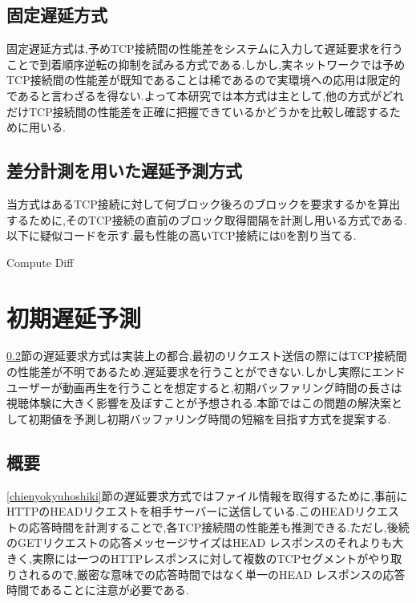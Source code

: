 \documentclass[a4j,12pt]{gradthesis_utf8}
\begin{document}
\subsection{固定遅延方式}
\label{kotei}
固定遅延方式は,予めTCP接続間の性能差をシステムに入力して遅延要求を行うことで到着順序逆転の抑制を試みる方式である.しかし,実ネットワークでは予めTCP接続間の性能差が既知であることは稀であるので実環境への応用は限定的であると言わざるを得ない.よって本研究では本方式は主として,他の方式がどれだけTCP接続間の性能差を正確に把握できているかどうかを比較し確認するために用いる.

\subsection{差分計測を用いた遅延予測方式}
\label{diff}
当方式はあるTCP接続に対して何ブロック後ろのブロックを要求するかを算出するために,そのTCP接続の直前のブロック取得間隔を計測し用いる方式である.以下に疑似コードを示す.最も性能の高いTCP接続には0を割り当てる.

\begin{algorithm}
	\caption{Compute Diff}
	\begin{algorithmic}[1]
		\Else 
		\EndIf
	\end{algorithmic}
	
\end{algorithm}

\section{初期遅延予測}
\label{shoki}
\ref{diff}節の遅延要求方式は実装上の都合,最初のリクエスト送信の際にはTCP接続間の性能差が不明であるため,遅延要求を行うことができない.しかし実際にエンドユーザーが動画再生を行うことを想定すると,初期バッファリング時間の長さは視聴体験に大きく影響を及ぼすことが予想される.本節ではこの問題の解決案として初期値を予測し初期バッファリング時間の短縮を目指す方式を提案する.

\subsection{概要}
\label{shokigaiyo}
\ref{chienyokyuhoshiki}節の遅延要求方式ではファイル情報を取得するために,事前にHTTPのHEADリクエストを相手サーバーに送信している.このHEADリクエストの応答時間を計測することで,各TCP接続間の性能差も推測できる.ただし,後続のGETリクエストの応答メッセージサイズはHEAD レスポンスのそれよりも大きく,実際には一つのHTTPレスポンスに対して複数のTCPセグメントがやり取りされるので,厳密な意味での応答時間ではなく単一のHEAD レスポンスの応答時間であることに注意が必要である.
\end{document}
